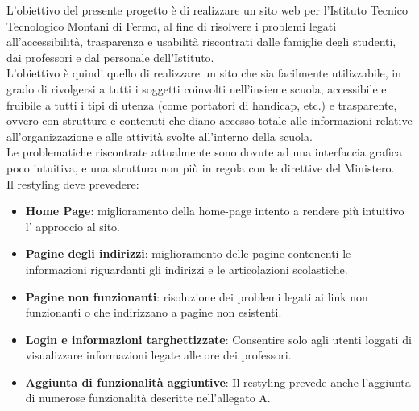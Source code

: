 \documentclass{article}
\begin{document}
	\begin{flushleft}

		L'obiettivo del presente progetto è di realizzare un sito web per l'Istituto Tecnico Tecnologico Montani di Fermo, al fine di risolvere i problemi legati all'accessibilità, trasparenza e usabilità riscontrati dalle famiglie degli studenti, dai professori e dal personale dell'Istituto. \\
		L'obiettivo è quindi quello di realizzare un sito che sia facilmente utilizzabile, in grado di rivolgersi a tutti i soggetti coinvolti nell'insieme scuola; accessibile e fruibile a tutti i tipi di utenza (come portatori di handicap, etc.) e trasparente, ovvero con strutture e contenuti che diano accesso totale alle informazioni relative all'organizzazione e alle attività svolte all'interno della scuola.\\
		Le problematiche riscontrate attualmente sono dovute ad una interfaccia grafica poco intuitiva, e una struttura non più in regola con le direttive del Ministero.   \\

		Il restyling deve prevedere:

		\begin{itemize}

			\item \textbf{Home Page}: miglioramento della home-page intento a rendere più intuitivo l' approccio al sito. 

			\item \textbf{Pagine degli indirizzi}: miglioramento delle pagine contenenti le informazioni riguardanti gli indirizzi e le articolazioni scolastiche.

			\item \textbf{Pagine non funzionanti}: risoluzione dei problemi legati ai link non funzionanti o che indirizzano a pagine non esistenti.

			\item \textbf{Login e informazioni targhettizzate}: Consentire solo agli utenti loggati di visualizzare informazioni legate alle ore dei professori.

			\item \textbf{Aggiunta di funzionalità aggiuntive}: Il restyling prevede anche l'aggiunta di numerose funzionalità descritte nell'allegato A.

			

		\end{itemize}

		\vspace{2mm}


\end{flushleft}
\end{document}
